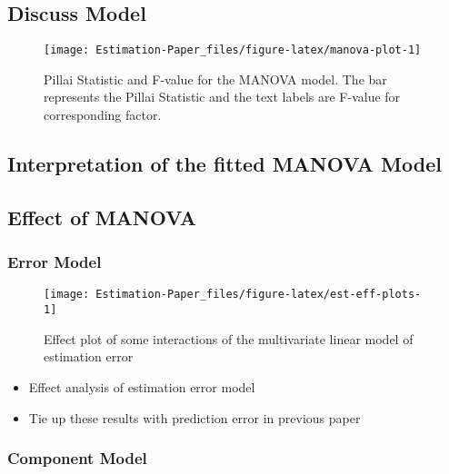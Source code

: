 \documentclass[12pt,3p,authoryear]{elsarticle}
\providecommand{\tightlist}{%
  \setlength{\itemsep}{0pt}\setlength{\parskip}{0pt}}
\begin{document}
\subsection{Discuss Model}\label{discuss-model}





\begin{figure}
\texttt{[image: Estimation-Paper\_files/figure-latex/manova-plot-1]} \caption{Pillai Statistic and F-value for the MANOVA model. The
bar represents the Pillai Statistic and the text labels are F-value for
corresponding factor.}\label{fig:manova-plot}
\end{figure}

\subsection{Interpretation of the fitted MANOVA
Model}\label{interpretation-of-the-fitted-manova-model}

\subsection{Effect of MANOVA}\label{effect-of-manova}

\subsubsection{Error Model}\label{error-model}




\begin{figure}
\texttt{[image: Estimation-Paper\_files/figure-latex/est-eff-plots-1]} \caption{Effect plot of some interactions of the multivariate
linear model of estimation error}\label{fig:est-eff-plots}
\end{figure}

\begin{itemize}
\tightlist
\item
  Effect analysis of estimation error model
\item
  Tie up these results with prediction error in previous paper
\end{itemize}

\subsubsection{Component Model}\label{component-model}
\end{document}
